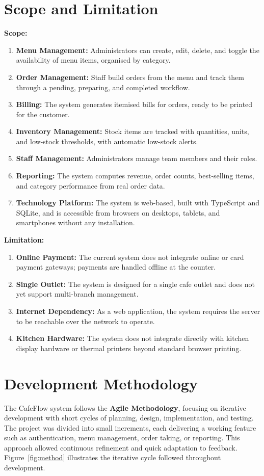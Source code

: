 \documentclass[12pt,a4paper]{report}
\begin{document}
\section{Scope and Limitation}
\textbf{Scope:}
\begin{enumerate}
  \item \textbf{Menu Management:} Administrators can create, edit, delete, and toggle the
        availability of menu items, organised by category.
  \item \textbf{Order Management:} Staff build orders from the menu and track them through a
        pending, preparing, and completed workflow.
  \item \textbf{Billing:} The system generates itemised bills for orders, ready to be printed
        for the customer.
  \item \textbf{Inventory Management:} Stock items are tracked with quantities, units, and
        low-stock thresholds, with automatic low-stock alerts.
  \item \textbf{Staff Management:} Administrators manage team members and their roles.
  \item \textbf{Reporting:} The system computes revenue, order counts, best-selling items, and
        category performance from real order data.
  \item \textbf{Technology Platform:} The system is web-based, built with TypeScript and
        SQLite, and is accessible from browsers on desktops, tablets, and smartphones without
        any installation.
\end{enumerate}

\textbf{Limitation:}
\begin{enumerate}
  \item \textbf{Online Payment:} The current system does not integrate online or card payment
        gateways; payments are handled offline at the counter.
  \item \textbf{Single Outlet:} The system is designed for a single cafe outlet and does not yet
        support multi-branch management.
  \item \textbf{Internet Dependency:} As a web application, the system requires the server to be
        reachable over the network to operate.
  \item \textbf{Kitchen Hardware:} The system does not integrate directly with kitchen display
        hardware or thermal printers beyond standard browser printing.
\end{enumerate}

\section{Development Methodology}
The CafeFlow system follows the \textbf{Agile Methodology}, focusing on iterative development
with short cycles of planning, design, implementation, and testing. The project was divided
into small increments, each delivering a working feature such as authentication, menu
management, order taking, or reporting. This approach allowed continuous refinement and
quick adaptation to feedback. Figure~\ref{fig:method} illustrates the iterative cycle followed
throughout development.
\end{document}
